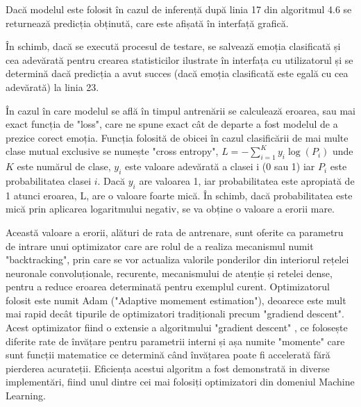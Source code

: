 \documentclass[a4paper,12pt]{book}
\begin{document}
		Dacă modelul este folosit în cazul de inferență după linia 17 din algoritmul 4.6 se returnează predicția obținută, care este afișată în interfață grafică. \par
		În schimb, dacă se execută procesul de testare, se salvează emoția clasificată și cea adevărată pentru crearea statisticilor ilustrate în interfața cu utilizatorul și se determină dacă predicția a avut succes (dacă emoția clasificată este egală cu cea adevărată) la linia 23. \par
		În cazul în care modelul se află în timpul antrenării se calculează eroarea, sau mai exact funcția de "loss", care ne spune exact cât de departe a fost modelul de a prezice corect emoția. Funcția folosită de obicei în cazul clasificării de mai multe clase mutual exclusive se numește "cross entropy", $L = -\sum_{i=1}^{K} y_i \log(P_i)$ unde $K$ este numărul de clase, $y_i$ este valoare adevărată a clasei i (0 sau 1) iar $P_i$ este probabilitatea clasei $i$. Dacă $y_i$ are valoarea 1, iar probabilitatea este apropiată de 1 atunci eroarea, L, are o valoare foarte mică. În schimb, dacă probabilitatea este mică prin aplicarea logaritmului negativ, se va obține o valoare a erorii mare. \par
		Această valoare a erorii, alături de rata de antrenare, sunt oferite ca parametru de intrare unui optimizator care are rolul de a realiza mecanismul numit "backtracking", prin care se vor actualiza valorile ponderilor din interiorul rețelei neuronale convoluționale, recurente, mecanismului de atenție și retelei dense, pentru a reduce eroarea determinată pentru exemplul curent. Optimizatorul folosit este numit Adam \cite{adam} ("Adaptive momement estimation"), deoarece este mult mai rapid decât tipurile de optimizatori tradiționali precum "gradiend descent". Acest optimizator fiind o extensie a algoritmului "gradient descent" , ce folosește diferite rate de învățare pentru parametrii interni și așa numite "momente" care sunt funcții matematice ce determină când învățarea poate fi accelerată fără pierderea acurateții. Eficiența acestui algoritm a fost demonstrată in diverse implementări, fiind unul dintre cei mai folosiți optimizatori din domeniul Machine Learning.
		
\end{document}
